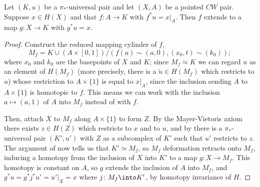 \documentclass[10pt]{article}
\begin{document}
\begin{lemma}
    \label{lem:pi-universal-extension-property}
    Let $(K,u)$ be a $\pi_*$-universal pair
    and let $(X,A)$ be a pointed $CW$ pair.
    Suppose $x\in H(X)$ and that $f\colon A\to K$ with $f^*u = x|_A$.
    Then $f$ extends to a map $g\colon X\to K$ with $g^*u = x$.
\end{lemma}

\begin{proof}
    Construct the reduced mapping cylinder of $f$,
    \begin{equation*}
	M_f = K\cup (A\times[0,1])/(f(a)\sim (a,0), (x_0,t)\sim(k_0));
    \end{equation*}
    where $x_0$ and $k_0$ are the basepoints of $X$ and $K$;
    since $M_f\simeq K$ we can regard $u$ as an element of $H(M_f)$
    (more precisely, there is a $\tilde u\in H(M_f)$
    which restricts to $u$) whose restriction to $A\times\{1\}$
    is equal to $x|_A$, since the inclusion sending $A$ to $A\times\{1\}$
    is homotopic to $f$. This means we can work with the inclusion
    $a\mapsto (a,1)$ of $A$ into $M_f$ instead of with $f$.

    Then, attach $X$ to $M_f$ along $A\times\{1\}$ to form $Z$.
    By the Mayer-Vietoris axiom there exists $z\in H(Z)$
    which restricts to $x$ and to $u$,
    and by 
    there is a $\pi_*$-universal pair $(K',u')$
    with $Z$ as a subcomplex of $K'$ such that $u'$ restricts to $z$.
    The argument of  now tells us that
    $K'\simeq M_f$, so $M_f$ deformation retracts onto $M_f$,
    inducing a homotopy from the inclusion of $X$ into $K'$
    to a map $g\colon X\to M_f$. This homotopy is constant on $A$,
    so $g$ extends the inclusion of $A$ into $M_f$,
    and $g^*u = g^* j^* u' = u'|_X = x$
    where $j\colon M_f\into K'$,
    by homotopy invariance of $H$.
\end{proof}
\end{document}
